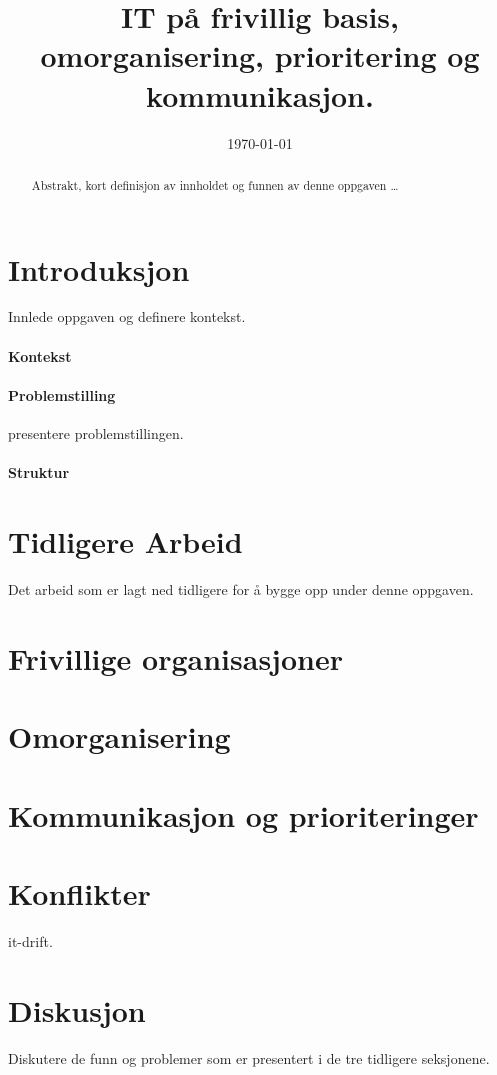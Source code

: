 \documentclass[12pt, a4paper]{article}
\title{
	IT på frivillig basis, omorganisering, prioritering og kommunikasjon.
}
\author{
}
\date{\today}
\begin{document}
\maketitle
{}

\begin{abstract}
Abstrakt, kort definisjon av innholdet og funnen av denne oppgaven \ldots
\end{abstract}

\section{Introduksjon}
Innlede oppgaven og definere kontekst. 

\paragraph{Kontekst}

\paragraph{Problemstilling}
presentere problemstillingen. 

\paragraph{Struktur}

\section{Tidligere Arbeid}\label{tidligere arbeid}
Det arbeid som er lagt ned tidligere for å bygge opp under denne oppgaven. 

\section{Frivillige organisasjoner}
\section{Omorganisering}
\section{Kommunikasjon og prioriteringer}
\section{Konflikter}
it-drift. 

\section{Diskusjon}\label{resultater}
Diskutere de funn og problemer som er presentert i de tre tidligere seksjonene. 
\end{document}
